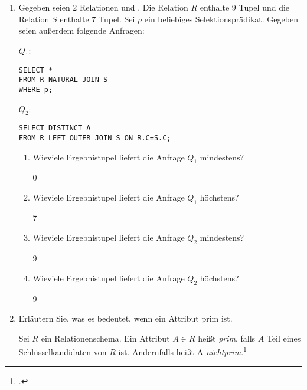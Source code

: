 \documentclass{bschlangaul-aufgabe}
\begin{document}
\begin{enumerate}

\item Gegeben seien 2 Relationen  und
. Die Relation $R$ enthalte $9$ Tupel und die
Relation $S$ enthalte $7$ Tupel. Sei $p$ ein beliebiges
Selektionsprädikat.
Gegeben seien außerdem folgende Anfragen:

$Q_1$:

\begin{verbatim}
SELECT *
FROM R NATURAL JOIN S
WHERE p;
\end{verbatim}

$Q_2$:

\begin{verbatim}
SELECT DISTINCT A
FROM R LEFT OUTER JOIN S ON R.C=S.C;
\end{verbatim}

\begin{enumerate}
\item Wieviele Ergebnistupel liefert die Anfrage $Q_1$ mindestens?

\begin{bAntwort}
0
\end{bAntwort}

\item Wieviele Ergebnistupel liefert die Anfrage $Q_1$ höchstens?

\begin{bAntwort}
7
\end{bAntwort}

\item Wieviele Ergebnistupel liefert die Anfrage $Q_2$ mindestens?

\begin{bAntwort}
9
\end{bAntwort}

\item Wieviele Ergebnistupel liefert die Anfrage $Q_2$ höchstens?

\begin{bAntwort}
9
\end{bAntwort}
\end{enumerate}


\item Erläutern Sie, was es bedeutet, wenn ein Attribut prim ist.

\begin{bAntwort}
Sei $R$ ein Relationenschema. Ein Attribut $A \in R$ heißt \emph{prim},
falls $A$ Teil eines Schlüsselkandidaten von $R$ ist. Andernfalls heißt
A \emph{nichtprim}.\footcite[Seite 191]{winter}
\end{bAntwort}


\end{enumerate}
\end{document}
